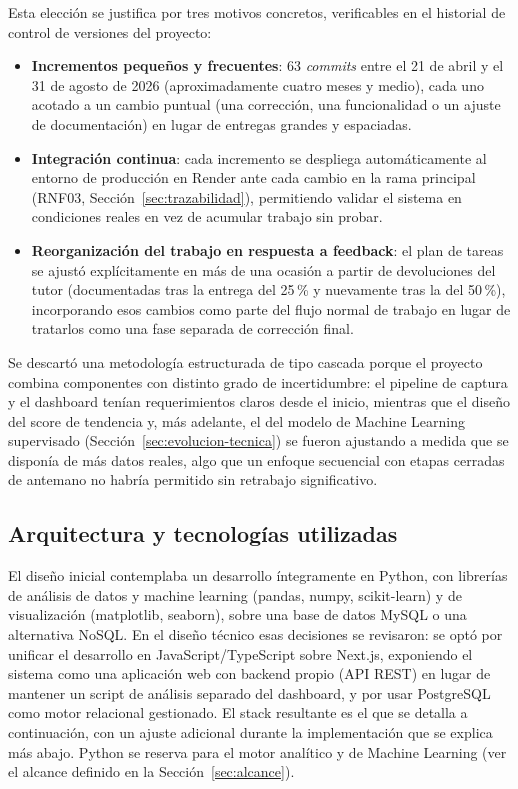Esta elección se justifica por tres motivos concretos, verificables en el historial de control de versiones del proyecto:

\begin{itemize}
	\item \textbf{Incrementos pequeños y frecuentes}: 63 \emph{commits} entre el 21 de abril y el 31 de agosto de 2026 (aproximadamente cuatro meses y medio), cada uno acotado a un cambio puntual (una corrección, una funcionalidad o un ajuste de documentación) en lugar de entregas grandes y espaciadas.
	\item \textbf{Integración continua}: cada incremento se despliega automáticamente al entorno de producción en Render ante cada cambio en la rama principal (RNF03, Sección~\ref{sec:trazabilidad}), permitiendo validar el sistema en condiciones reales en vez de acumular trabajo sin probar.
	\item \textbf{Reorganización del trabajo en respuesta a feedback}: el plan de tareas se ajustó explícitamente en más de una ocasión a partir de devoluciones del tutor (documentadas tras la entrega del 25\,\% y nuevamente tras la del 50\,\%), incorporando esos cambios como parte del flujo normal de trabajo en lugar de tratarlos como una fase separada de corrección final.
\end{itemize}

Se descartó una metodología estructurada de tipo cascada porque el proyecto combina componentes con distinto grado de incertidumbre: el pipeline de captura y el dashboard tenían requerimientos claros desde el inicio, mientras que el diseño del score de tendencia y, más adelante, el del modelo de Machine Learning supervisado (Sección~\ref{sec:evolucion-tecnica}) se fueron ajustando a medida que se disponía de más datos reales, algo que un enfoque secuencial con etapas cerradas de antemano no habría permitido sin retrabajo significativo.

\subsection{Arquitectura y tecnologías utilizadas}

El diseño inicial contemplaba un desarrollo íntegramente en Python, con librerías de análisis de datos y machine learning (pandas, numpy, scikit-learn) y de visualización (matplotlib, seaborn), sobre una base de datos MySQL o una alternativa NoSQL. En el diseño técnico esas decisiones se revisaron: se optó por unificar el desarrollo en JavaScript/TypeScript sobre Next.js, exponiendo el sistema como una aplicación web con backend propio (API REST) en lugar de mantener un script de análisis separado del dashboard, y por usar PostgreSQL como motor relacional gestionado. El stack resultante es el que se detalla a continuación, con un ajuste adicional durante la implementación que se explica más abajo. Python se reserva para el motor analítico y de Machine Learning (ver el alcance definido en la Sección~\ref{sec:alcance}).

